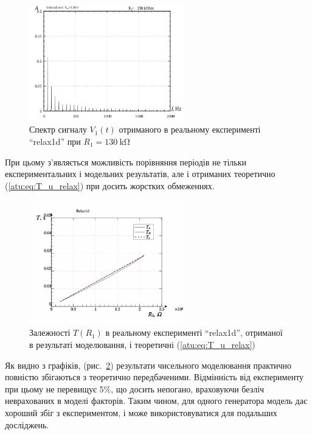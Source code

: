 \begin{figure}[htb!]
  \centerline{\includegraphics[width=0.6\textwidth]{p/relax1d_f_r1=130k.png} }
\caption{Спектр сигналу $ V_1 (t) $ отриманого в реальному експерименті ``relax1d'' при $ R_1 = \SI{130}{\kilo \ohm} $}
  \label{atu:f:relax1d_f_r1}
\end{figure}

При цьому з'являється можливість порівняння періодів не тільки
експериментальних і модельних результатів, але і отриманих
теоретично (\ref{atu:eq:T_u_relax}) при досить жорстких обмеженнях.


\begin{figure}[htb!]
  \centerline{\includegraphics[width=0.6\textwidth]{p/relax1d_read_cmp-p_R1_T.png} }
\caption{Залежності $ T (R_1) $ в реальному експерименті ``relax1d'', отриманої в результаті моделювання, і теоретичні (\ref{atu:eq:T_u_relax})}
\label{atu:f:relax1d_read_cmp-p_R1_T}
\end{figure}


Як видно з графіків, (рис.~\ref{atu:f:relax1d_read_cmp-p_R1_T}) результати
чисельного моделювання практично повністю збігаються з
теоретично передбаченими. Відмінність від експерименту при
цьому не перевищує 5\%, що досить непогано, враховуючи безліч
неврахованих в моделі факторів. Таким чином, для одного
генератора модель дає хороший збіг з експериментом, і може
використовуватися для подальших досліджень.

